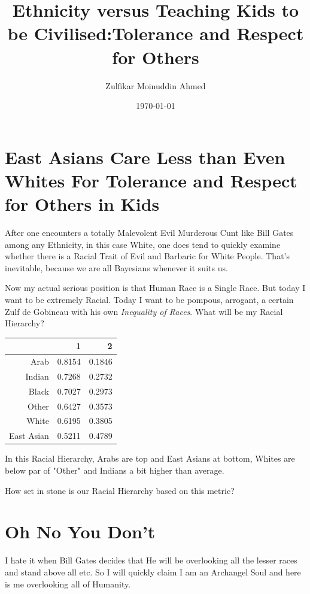 \documentclass{amsart}
\title{Ethnicity versus Teaching Kids to be Civilised:Tolerance and Respect for Others}
\author{Zulfikar Moinuddin Ahmed}
\date{\today}
\begin{document}
\maketitle

\section{East Asians Care Less than Even Whites For Tolerance and Respect for Others in Kids}

After one encounters a totally Malevolent Evil Murderous Cunt like Bill Gates among any Ethnicity, in this case White, one does tend to quickly examine whether there is a Racial Trait of Evil and Barbaric for White People.  That's inevitable, because we are all Bayesians whenever it suits us.

Now my actual serious position is that Human Race is a Single Race.  But today I want to be extremely Racial.  Today I want to be pompous, arrogant, a certain Zulf de Gobineau with his own {\em Inequality of Races}.  What will be my Racial Hierarchy?

\begin{table}[ht]
\centering
\begin{tabular}{rrr}
  \hline
 & 1 & 2 \\ 
  \hline
Arab & 0.8154 & 0.1846 \\ 
  Indian & 0.7268 & 0.2732 \\ 
  Black & 0.7027 & 0.2973 \\ 
  Other & 0.6427 & 0.3573 \\ 
  White & 0.6195 & 0.3805 \\ 
  East Asian & 0.5211 & 0.4789 \\ 
   \hline
\end{tabular}
\end{table}
In this Racial Hierarchy, Arabs are top and East Asians at bottom, Whites are below par of "Other" and Indians a bit higher than average.  

How set in stone is our Racial Hierarchy based on this metric?

\section{Oh No You Don't}

I hate it when Bill Gates decides that He will be overlooking all the lesser races and stand above all etc.  So I will quickly claim I am an Archangel Soul and here is me overlooking all of Humanity.
\end{document}
